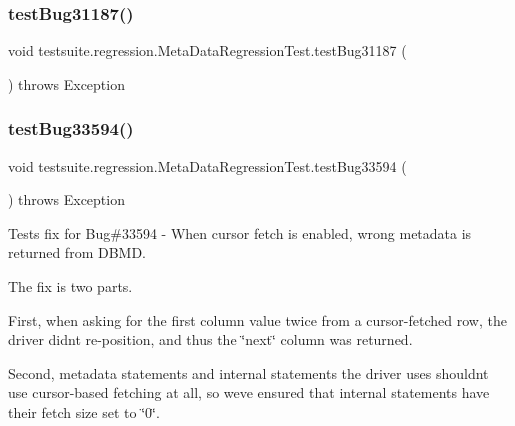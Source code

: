 \subsubsection{\texorpdfstring{test\+Bug31187()}{testBug31187()}}
{\footnotesize\ttfamily void testsuite.\+regression.\+Meta\+Data\+Regression\+Test.\+test\+Bug31187 (\begin{DoxyParamCaption}{ }\end{DoxyParamCaption}) throws Exception}

\mbox{\label{classtestsuite_1_1regression_1_1_meta_data_regression_test_adb0cee1c23451feae0c5ee851ee0d5ba}} 
\subsubsection{\texorpdfstring{test\+Bug33594()}{testBug33594()}}
{\footnotesize\ttfamily void testsuite.\+regression.\+Meta\+Data\+Regression\+Test.\+test\+Bug33594 (\begin{DoxyParamCaption}{ }\end{DoxyParamCaption}) throws Exception}

Tests fix for Bug\#33594 -\/ When cursor fetch is enabled, wrong metadata is returned from D\+B\+MD.

The fix is two parts.

First, when asking for the first column value twice from a cursor-\/fetched row, the driver didn\textquotesingle{}t re-\/position, and thus the \char`\"{}next\char`\"{} column was returned.

Second, metadata statements and internal statements the driver uses shouldn\textquotesingle{}t use cursor-\/based fetching at all, so we\textquotesingle{}ve ensured that internal statements have their fetch size set to \char`\"{}0\char`\"{}. \mbox{\label{classtestsuite_1_1regression_1_1_meta_data_regression_test_ac79bd5bb01b78e780d95f5d0fb285541}} 
